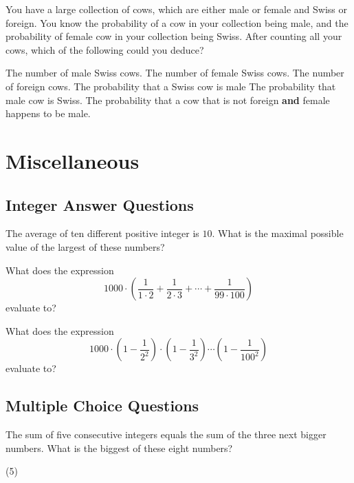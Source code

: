 \documentclass{article}
\begin{document}
\begin{problem}
You have a large collection of cows, which are either male or female and Swiss or foreign. You know the probability of a cow in your collection being male, and the probability of female cow in your collection being Swiss. After counting all your cows, which of the following could you deduce?
\begin{tasks}
\task The number of male Swiss cows.
\task The number of female Swiss cows.
\task The number of foreign cows.
\task The probability that a Swiss cow is male
\task The probability that male cow is Swiss.
\task The probability that a cow that is not foreign \textbf{and} female happens to be male.
\end{tasks}
\end{problem}

\section{Miscellaneous}
\subsection{Integer Answer Questions}

\begin{problem}
The average of ten different positive integer is $10$. What is the maximal possible value of the largest of these numbers?
\end{problem}

\begin{problem}
What does the expression
$$1000\cdot\left(\frac{1}{1\cdot 2} + \frac{1}{2\cdot 3} + \cdots + \frac{1}{99\cdot 100}\right)$$
evaluate to?
\end{problem}

\begin{problem}
What does the expression
$$1000\cdot\left(1-\frac{1}{2^2}\right)\cdot\left(1-\frac{1}{3^2}\right)\cdots\left(1-\frac{1}{100^2}\right)$$
evaluate to?
\end{problem}

\subsection{Multiple Choice Questions}

\begin{problem} %
The sum of five consecutive integers equals the sum of the three next bigger numbers. What is the biggest of these eight numbers?
\end{problem}
\begin{tasks}(5)
\end{tasks}
\end{document}
